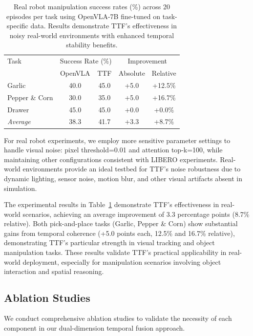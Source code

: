 \documentclass[letterpaper]{article}
\begin{document}
\begin{table}[h]
\centering
\small
\begin{tabular}{l|cc|cc}
\hline
Task & \multicolumn{2}{c|}{Success Rate (\%)} & \multicolumn{2}{c}{Improvement} \\
& OpenVLA & TTF & Absolute & Relative \\
\hline
Garlic & 40.0 & 45.0 & +5.0 & +12.5\% \\
Pepper \& Corn & 30.0 & 35.0 & +5.0 & +16.7\% \\
Drawer & 45.0 & 45.0 & +0.0 & +0.0\% \\
\hline
\textit{Average} & 38.3 & 41.7 & +3.3 & +8.7\% \\
\hline
\end{tabular}
\caption{Real robot manipulation success rates (\%) across 20 episodes per task using OpenVLA-7B fine-tuned on task-specific data. Results demonstrate TTF's effectiveness in noisy real-world environments with enhanced temporal stability benefits.}
\label{tab:real_robot_results}
\end{table}

For real robot experiments, we employ more sensitive parameter settings to handle visual noise: pixel threshold=0.01 and attention top-k=100, while maintaining other configurations consistent with LIBERO experiments. Real-world environments provide an ideal testbed for TTF's noise robustness due to dynamic lighting, sensor noise, motion blur, and other visual artifacts absent in simulation.

The experimental results in Table~\ref{tab:real_robot_results} demonstrate TTF's effectiveness in real-world scenarios, achieving an average improvement of 3.3 percentage points (8.7\% relative). Both pick-and-place tasks (Garlic, Pepper \& Corn) show substantial gains from temporal coherence (+5.0 points each, 12.5\% and 16.7\% relative), demonstrating TTF's particular strength in visual tracking and object manipulation tasks. These results validate TTF's practical applicability in real-world deployment, especially for manipulation scenarios involving object interaction and spatial reasoning.


\subsection{Ablation Studies}

We conduct comprehensive ablation studies to validate the necessity of each component in our dual-dimension temporal fusion approach.
\end{document}
